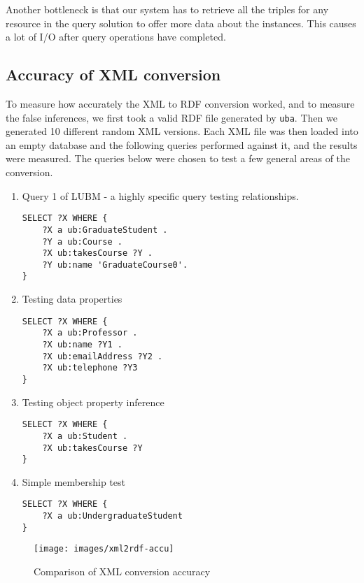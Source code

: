 \documentclass[journal]{IEEEtran}
\begin{document}
Another bottleneck is that our system has to retrieve all the triples for any
resource in the query solution to offer more data about the instances. This
causes a lot of I/O after query operations have completed.

\subsection{Accuracy of XML conversion}

To measure how accurately the XML to RDF conversion worked, and to measure the
false inferences, we first took a valid RDF file generated by \texttt{uba}.
Then we generated 10 different random XML versions. Each XML file was then
loaded into an empty database and the following queries performed against it,
and the results were measured. The queries below were chosen to test a few
general areas of the conversion.

\begin{enumerate}
    \item Query 1 of LUBM - a highly specific query testing relationships.
        \begin{verbatim}
SELECT ?X WHERE {
    ?X a ub:GraduateStudent .
    ?Y a ub:Course .
    ?X ub:takesCourse ?Y .
    ?Y ub:name 'GraduateCourse0'.
}
        \end{verbatim}

    \item Testing data properties
        \begin{verbatim}
SELECT ?X WHERE {
    ?X a ub:Professor .
    ?X ub:name ?Y1 .
    ?X ub:emailAddress ?Y2 .
    ?X ub:telephone ?Y3
}
        \end{verbatim}

    \item Testing object property inference
        \begin{verbatim}
SELECT ?X WHERE {
    ?X a ub:Student .
    ?X ub:takesCourse ?Y
}
        \end{verbatim}

    \item Simple membership test
        \begin{verbatim}
SELECT ?X WHERE {
    ?X a ub:UndergraduateStudent
}
        \end{verbatim}
\end{enumerate}

\begin{figure}[h]
    \centering
    \texttt{[image: images/xml2rdf-accu]}
    \caption{Comparison of XML conversion accuracy}
    \label{fig:eval:accu}
\end{figure}
\end{document}
